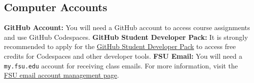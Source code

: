 
\subsection*{Computer Accounts}

\begin{outline}
  \1 \textbf{GitHub Account:} You will need a GitHub account to access course assignments and use GitHub Codespaces.
  \1 \textbf{GitHub Student Developer Pack:} It is strongly recommended to apply for the 
     \href{https://education.github.com/pack}{GitHub Student Developer Pack} to access free credits for Codespaces and other developer tools.
  \1 \textbf{FSU Email:} You will need a \texttt{my.fsu.edu} account for receiving class emails. For more information, visit the
     \href{https://servicecenter.fsu.edu/s/article/Email-Account-Management-Information2}{FSU email account management page}.
\end{outline}

  
  
 
